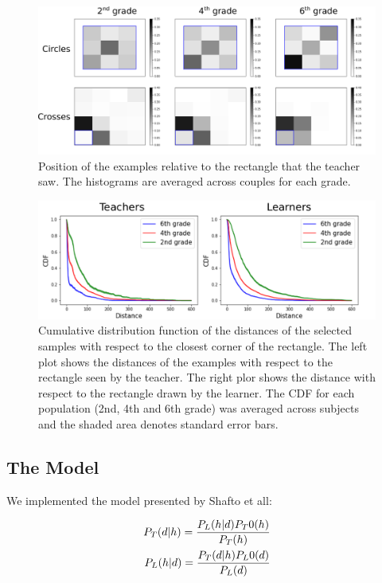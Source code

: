 \documentclass[a4paper,10pt]{article}
\begin{document}
\begin{figure}
    \centering
    \includegraphics[width=6.0in]{figures/samples_positions_histograms.pdf}
    \caption{Position of the examples relative to the rectangle that the teacher saw. The histograms are averaged across couples for each grade.}
    \label{simulationfigure}
\end{figure}

\begin{figure}
    \centering
    \includegraphics[width=6.0in]{figures/Distance_to_corners_teachers_learners.pdf}
    \caption{Cumulative distribution function of the distances of the selected samples with respect to the closest corner of the rectangle. The left plot shows the distances of the examples with respect to the rectangle seen by the teacher. The right plor shows the distance with respect to the rectangle drawn by the learner. The CDF for each population (2nd, 4th and 6th grade) was averaged across subjects and the shaded area denotes standard error bars.}
    \label{dist_2_corners}
\end{figure}


\subsection{The Model}

We implemented the model presented by Shafto et all:

\begin{align}
 P_T (d|h) = \frac{P_L (h|d) P_T0(h)}{P_T(h)} \\
 P_L (h|d) = \frac{P_T (d|h) P_L0(d)}{P_L(d)} \notag
\end{align}
\end{document}
